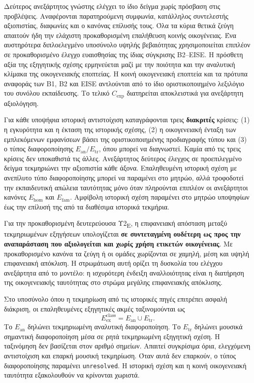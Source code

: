 \documentclass[11pt,a4paper]{article}
\begin{document}
Δεύτερος ανεξάρτητος γνώστης ελέγχει το ίδιο δείγμα χωρίς πρόσβαση στις προβλέψεις. Αναφέρονται παρατηρούμενη συμφωνία, κατάλληλος συντελεστής αξιοπιστίας, διαφωνίες και ο κανόνας επίλυσής τους. Όλα τα κύρια θετικά ζεύγη απαιτούν ήδη την ελάχιστη προκαθορισμένη επαλήθευση κοινής οικογένειας. Ένα αυστηρότερα διπλοελεγμένο υποσύνολο υψηλής βεβαιότητας χρησιμοποιείται επιπλέον σε προκαθορισμένο έλεγχο ευαισθησίας της ίδιας σύγκρισης B2--EISE. Η πρόσθετη αξία της εξηγητικής σχέσης ερμηνεύεται μαζί με την ποιότητα και την αναλυτική κλίμακα της οικογενειακής εποπτείας. Η κοινή οικογενειακή εποπτεία και τα πρότυπα αναφοράς των B1, B2 και EISE αντλούνται από το ίδιο οριστικοποιημένο λεξιλόγιο του συνόλου εκπαίδευσης. Το τελικό $C_{\mathrm{exp}}$ διατηρείται αποκλειστικά για ανεξάρτητη αξιολόγηση.

Για κάθε υποψήφια ιστορική αντιστοίχιση καταγράφονται τρεις \textbf{διακριτές} κρίσεις: (1) η εγκυρότητα και η έκταση της ιστορικής σχέσης, (2) η οικογενειακή ένταξη των εμπλεκόμενων εμφανίσεων βάσει της οριστικοποιημένης προδιαγραφής τύπου και (3) ο τύπος διαφοροποίησης $E_{\mathrm{an}}/E_{\mathrm{tr}}$, όπου μπορεί να διαγνωστεί. Καμία από τις τρεις κρίσεις δεν υποκαθιστά τις άλλες. Ανεξάρτητος δεύτερος έλεγχος σε προεπιλεγμένο δείγμα τεκμηριώνει την αξιοπιστία κάθε άξονα. Επαληθευμένη ιστορική σχέση με ανεπίλυτο τύπο διαφοροποίησης μπορεί να παραμένει στο μητρώο, αλλά τροφοδοτεί την εκπαιδευτική απώλεια ταυτότητας μόνο όταν πληρούνται επιπλέον οι ανεξάρτητοι κανόνες $E_{\mathrm{hom}}$ και $E_{\mathrm{fam}}$. Αμφίβολη ιστορική σχέση παραμένει στο μητρώο υποψηφίων έως την επίλυσή της από τα διαθέσιμα ιστορικά τεκμήρια.

Για την προκαθορισμένη δευτερεύουσα Υ2\textsubscript{E}, η επιφανειακή απόσταση μεταξύ τεκμηριωμένων εξηγήσεων υπολογίζεται \textbf{σε συντεταγμένη ουδέτερη ως προς την αναπαράσταση που αξιολογείται και χωρίς χρήση ετικετών οικογένειας}. Με προκαθορισμένο κανόνα τα ζεύγη ή οι ομάδες χωρίζονται σε χαμηλή, μέση και υψηλή επιφανειακή απόκλιση. Η στρωμάτωση αυτή ορίζει τη δυσκολία του ελέγχου ανεξάρτητα από το μοντέλο: η ισχυρότερη ένδειξη αναλλοιότητας είναι η διατήρηση της οικογενειακής ταυτότητας στο στρώμα μεγάλης επιφανειακής απόκλισης.

Στο υποσύνολο όπου η τεκμηρίωση από τις ιστορικές πηγές επιτρέπει ασφαλή διάκριση, οι επαληθευμένες εξηγητικές ακμές ταξινομούνται ως
\[
E_{\mathrm{ex}}^{\mathrm{class}}=E_{\mathrm{an}}\cup E_{\mathrm{tr}}.
\]
Το $E_{\mathrm{an}}$ δηλώνει τεκμηριωμένη αναλυτική διαφοροποίηση. Το $E_{\mathrm{tr}}$ δηλώνει μουσικά σημαντική διαφοροποίηση μέσα σε ρητά τεκμηριωμένη εξηγητική σχέση. Η ταξινόμηση δεν βασίζεται στον αριθμό σημείων. Απαιτεί συγκρίσιμα όρια, ελεγχόμενη αντιστοίχιση και επαρκή μουσική τεκμηρίωση. Όταν αυτά δεν επαρκούν, ο τύπος διαφοροποίησης παραμένει \texttt{unresolved}. Η ιστορική σχέση και η κοινή οικογενειακή ταυτότητα εξακολουθούν να κρίνονται χωριστά.
\end{document}
